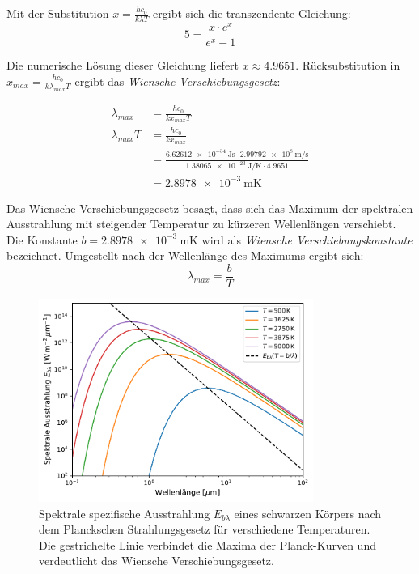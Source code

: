 \documentclass[12pt,a4paper]{article}
\begin{document}
Mit der Substitution $x = \frac{hc_0}{k\lambda T}$ ergibt sich die transzendente Gleichung:
\begin{equation*}
  5 = \frac{x\cdot e^x}{e^x -1}
\end{equation*}

Die numerische Lösung dieser Gleichung liefert $x \approx 4.9651$. 
Rücksubstitution in $x_{max} = \frac{hc_0}{k\lambda_{max} T}$ ergibt das \textit{Wiensche Verschiebungsgesetz}:

\begin{align*}
\lambda_{max} &= \frac{h c_0}{k x_{max} T} \\
\lambda_{max} T &= \frac{h c_0}{k x_{max}} \\
&= \frac{\SI{6.62612e-34}{\joule\second} \cdot \SI{2.99792e8}{\meter\per\second}}{\SI{1.38065e-23}{\joule\per\kelvin} \cdot 4.9651}\\
&= \SI{2.8978e-3}{\meter\kelvin}
\end{align*}


Das Wiensche Verschiebungsgesetz besagt, dass sich das Maximum der spektralen Ausstrahlung mit steigender Temperatur zu kürzeren Wellenlängen verschiebt\cite[S.101]{kraus2007atmosphäre}.
Die Konstante $b = \SI{2.8978e-3}{\meter\kelvin}$ wird als \textit{Wiensche Verschiebungskonstante} bezeichnet\cite[S.49]{codata2018}.
Umgestellt nach der Wellenlänge des Maximums ergibt sich:
\begin{equation}
  \label{Wien umgestellt}
  \lambda_{max} = \frac{b}{T}
\end{equation}

\begin{figure}[H]
    \centering
    \includegraphics[width=0.8\textwidth]{assets/wien_plot.pdf}
    \caption{Spektrale spezifische Ausstrahlung $E_{b\lambda}$ eines schwarzen Körpers nach dem Planckschen Strahlungsgesetz für verschiedene Temperaturen. Die gestrichelte Linie verbindet die Maxima der Planck-Kurven und verdeutlicht das Wiensche Verschiebungsgesetz.}
    \label{fig:planck_wien}
\end{figure}
\end{document}
